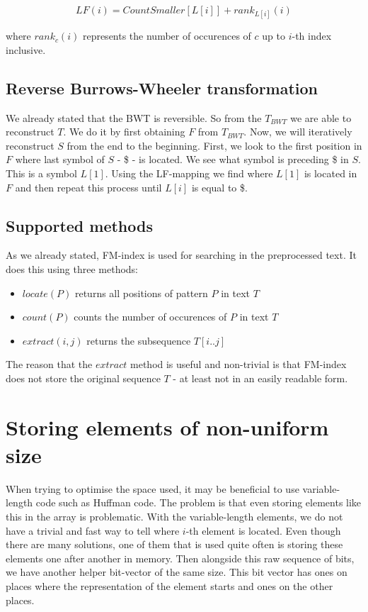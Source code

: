 				$$LF(i) = CountSmaller[L[i]] + rank_{L[i]}(i)$$

where $rank_c(i)$ represents the number of occurences of $c$ up to $i$-th index inclusive.

\subsection{Reverse Burrows-Wheeler transformation}

We already stated that the BWT is reversible. So from the $T_{BWT}$ we are able to reconstruct
$T$. We do it by first obtaining $F$ from $T_{BWT}$. Now, we will iteratively reconstruct $S$
from the end to the beginning. First, we look to the first position in $F$ where last symbol
of $S$ - \$ - is located. We see what symbol is preceding \$ in $S$. This is a symbol
$L[1]$. Using the LF-mapping we find where $L[1]$ is located in $F$ and then repeat this process
until $L[i]$ is equal to \$.

\subsection{Supported methods}

As we already stated, FM-index is used for searching in the preprocessed text.
It does this using three methods:

\begin{itemize}
\item $locate(P)$ returns all positions of pattern $P$ in text $T$
\item $count(P)$ counts the number of occurences of $P$ in text $T$
\item $extract(i, j)$ returns the subsequence $T[i..j]$
\end{itemize}

The reason that the $extract$ method is useful and non-trivial is that FM-index
does not store the original sequence $T$ - at least not in an easily readable form.


\section{Storing elements of non-uniform size}

When trying to optimise the space used, it may be beneficial to use variable-length
code such as Huffman code. The problem is that even storing elements like this in
the array is problematic. With the variable-length elements, we do not have a trivial
and fast way to tell where $i$-th element is located. Even though there are many
solutions, one of them that is used quite often is storing these elements one after
another in memory. Then alongside this raw sequence of bits, we have another helper
bit-vector of the same size. This bit vector has ones on places where the representation
of the element starts and ones on the other places.

